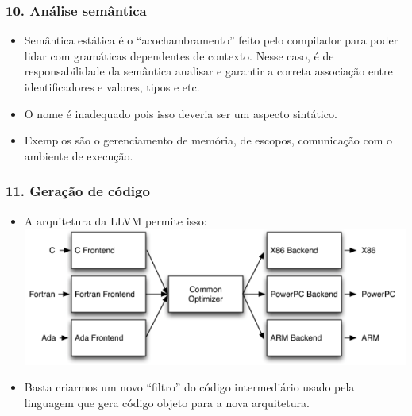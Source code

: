 \documentclass{beamer}
\begin{document}
\begin{frame}
  \frametitle{10. An\'alise sem\^antica}
  \begin{itemize}
  \item Sem\^antica est\'atica \'e o ``acochambramento'' feito pelo
    compilador para poder lidar com gram\'aticas dependentes de
    contexto. Nesse caso, \'e de responsabilidade da sem\^antica
    analisar e garantir a correta associa\c c\~ao entre
    identificadores e valores, tipos e etc.
  \item O nome \'e inadequado pois isso deveria ser um aspecto sint\'atico.
  \item Exemplos s\~ao o gerenciamento de mem\'oria, de escopos,
    comunica\c c\~ao com o ambiente de execu\c c\~ao.
  \end{itemize}
\end{frame}

\begin{frame}
  \frametitle{11. Gera\c c\~ao de c\'odigo}
  \begin{itemize}
  \item A arquitetura da LLVM permite isso:
    \includegraphics[width=.8\pdfpagewidth]{llvm.png}
  \item Basta criarmos um novo ``filtro'' do c\'odigo intermedi\'ario
    usado pela linguagem que gera c\'odigo objeto para a nova arquitetura.
  \end{itemize}
\end{frame}
\end{document}
